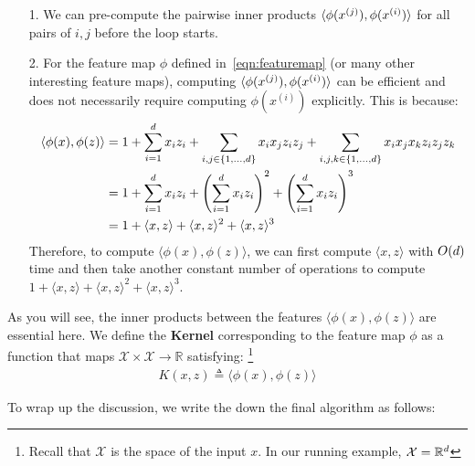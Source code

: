 \documentclass{article}
\begin{document}
\begin{itemize}
	\item[1.] We can pre-compute the pairwise inner products $\langle {\phi(x^{(j)})}, \phi({x^{(i)}})\rangle$ for all pairs of $i,j$ before the loop starts. 
	\item[2.] For the feature map $\phi$ defined in~\eqref{eqn:featuremap} (or many other interesting feature maps), computing $\langle {\phi(x^{(j)})}, \phi({x^{(i)}})\rangle$ can be efficient and does not necessarily require computing $\phi(x^{(i)})$ explicitly. This is because:
	\begin{align}
	\langle\phi(x), \phi(z)\rangle & = 1 + \sum_{i=1}^{{d}} x_iz_i + \sum_{i,j\in \{1,\dots, {d}\}}x_ix_j z_iz_j + \sum_{i,j,k\in \{1,\dots, {d}\}} x_ix_jx_kz_iz_jz_k \nonumber \\
	& = 1 + \sum_{i=1}^{{d}} x_iz_i + 	\left(\sum_{i=1}^{{d}} x_iz_i\right)^2 + \left(\sum_{i=1}^{{d}} x_iz_i\right)^3 \nonumber\\
	& = 1 + \langle x, z\rangle +\langle x, z\rangle^2 + \langle x, z\rangle^3 \label{eqn:efficient}
	\end{align}
	Therefore, to compute $	\langle\phi(x), \phi(z)\rangle $, we can first compute $\langle x, z\rangle$ with $O({d})$ time and then take another constant number of operations to compute $ 1 + \langle x, z\rangle +\langle x, z\rangle^2 + \langle x, z\rangle^3$. 
\end{itemize}

As you will see, the inner products between the features $	\langle\phi(x), \phi(z)\rangle $ are essential here. We define the {\bf Kernel} corresponding to the feature map $\phi$ as a function that maps $\mathcal{X}\times \mathcal{X} \rightarrow \mathbb{R}$ satisfying: \footnote{Recall that $\mathcal{X}$ is the space of the input $x$. In our running example, $\mathcal{X} = \mathbb{R}^{{d}}$}
\begin{align}
K(x,z) \triangleq 	\langle\phi(x), \phi(z)\rangle
\end{align}

To wrap up the discussion, we write the down the final algorithm as follows: 
\end{document}
